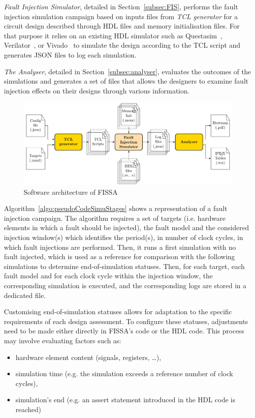 \textit{Fault Injection Simulator}, detailed in Section~\ref{subsec:FIS}, performs the fault injection simulation campaign based on inputs files from \textit{TCL generator} for a circuit design described through HDL files and memory initialisation files. For that purpose it relies on an existing HDL simulator such as Questasim~\cite{questasim}, Verilator~\cite{verilator}, or Vivado~\cite{vivado} to simulate the design according to the TCL script and generates JSON files to log each simulation.

\textit{The Analyser}, detailed in Section~\ref{subsec:analyser}, evaluates the outcomes of the simulations and generates a set of files that allows the designers to examine fault injection effects on their designs through various information.


\begin{figure}[ht]
    \centering
    \includegraphics[width=\textwidth]{c4_fissa/img/fissa/archi_gen_tcl.pdf}
    \caption{Software architecture of FISSA}
    \label{fig:archi_fissa}
\end{figure}

Algorithm~\ref{algo:pseudoCodeSimuStages} shows a representation of a fault injection campaign. The algorithm requires a set of targets  (i.e. hardware elements in which a fault should be
injected), the fault model and the considered injection window(s) which identifies the period(s), in number of clock cycles, in which fault injections are performed.
Then, it runs a first simulation with no fault injected, which is used as a reference for comparison with the following simulations to determine end-of-simulation statuses. 
Then, for each target, each fault model and for each clock cycle within the injection window, the corresponding simulation is executed, and the corresponding logs are stored in a dedicated file.

Customising end-of-simulation statuses allows for adaptation to the specific requirements of each design assessment. To configure these statuses, adjustments need to be made either directly in FISSA's code or the HDL code. This process may involve evaluating factors such as:
\begin{itemize}
    \item hardware element content (signals, registers, \ldots),
    \item simulation time (e.g. the simulation exceeds a reference number of clock cycles),
    \item simulation's end (e.g. an assert statement introduced in the HDL code is reached)
\end{itemize}

